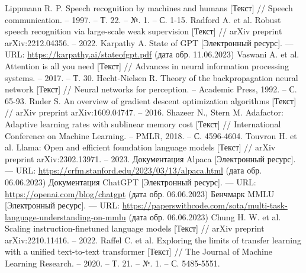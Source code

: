 \begin{thebibliography}{99}
  Lippmann R. P. Speech recognition by machines and humans [Текст] // Speech communication. – 1997. – Т. 22. – №. 1. – С. 1-15.
  Radford A. et al. Robust speech recognition via large-scale weak supervision [Текст] // arXiv preprint arXiv:2212.04356. – 2022.
  Karpathy A. State of GPT [Электронный ресурс]. --- URL: \url{https://karpathy.ai/stateofgpt.pdf} (дата обр. 11.06.2023)
  Vaswani A. et al. Attention is all you need [Текст] // Advances in neural information processing systems. – 2017. – Т. 30.
  Hecht-Nielsen R. Theory of the backpropagation neural network [Текст] // Neural networks for perception. – Academic Press, 1992. – С. 65-93.
  Ruder S. An overview of gradient descent optimization algorithms [Текст] // arXiv preprint arXiv:1609.04747. – 2016.
  Shazeer N., Stern M. Adafactor: Adaptive learning rates with sublinear memory cost [Текст] // International Conference on Machine Learning. – PMLR, 2018. – С. 4596-4604.
  Touvron H. et al. Llama: Open and efficient foundation language models [Текст] // arXiv preprint arXiv:2302.13971. – 2023.
  Документация Alpaca [Электронный ресурс]. --- URL: \url{https://crfm.stanford.edu/2023/03/13/alpaca.html} (дата обр. 06.06.2023)
  Документация ChatGPT [Электронный ресурс]. --- URL: \url{https://openai.com/blog/chatgpt} (дата обр. 06.06.2023)
  Бенчмарк MMLU [Электронный ресурс]. --- URL: \url{https://paperswithcode.com/sota/multi-task-language-understanding-on-mmlu} (дата обр. 06.06.2023)
  Chung H. W. et al. Scaling instruction-finetuned language models [Текст] // arXiv preprint arXiv:2210.11416. – 2022.
  Raffel C. et al. Exploring the limits of transfer learning with a unified text-to-text transformer [Текст] // The Journal of Machine Learning Research. – 2020. – Т. 21. – №. 1. – С. 5485-5551.
\end{thebibliography}